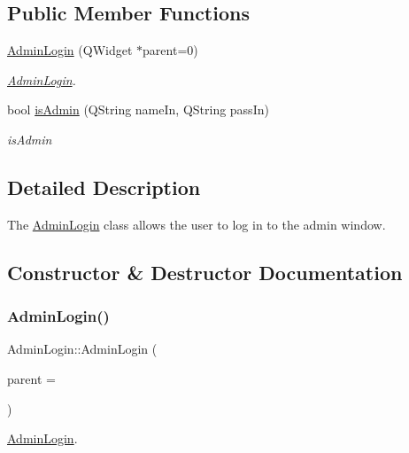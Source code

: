 \subsection*{Public Member Functions}
\begin{DoxyCompactItemize}
\item 
\hyperlink{class_admin_login_a3e1c90c550d6d7abf2a58c4919e80461}{Admin\+Login} (Q\+Widget $\ast$parent=0)
\begin{DoxyCompactList}\small\item\em \hyperlink{class_admin_login}{Admin\+Login}. \end{DoxyCompactList}\item 
bool \hyperlink{class_admin_login_a7b096251d552fafeae34a229e748398c}{is\+Admin} (Q\+String name\+In, Q\+String pass\+In)
\begin{DoxyCompactList}\small\item\em is\+Admin \end{DoxyCompactList}\end{DoxyCompactItemize}


\subsection{Detailed Description}
The \hyperlink{class_admin_login}{Admin\+Login} class allows the user to log in to the admin window. 

\subsection{Constructor \& Destructor Documentation}
\mbox{\label{class_admin_login_a3e1c90c550d6d7abf2a58c4919e80461}} 
\subsubsection{\texorpdfstring{Admin\+Login()}{AdminLogin()}}
{\footnotesize\ttfamily Admin\+Login\+::\+Admin\+Login (\begin{DoxyParamCaption}\item[{Q\+Widget $\ast$}]{parent = {} }\end{DoxyParamCaption})\hspace{0.3cm}{\ttfamily [explicit]}}



\hyperlink{class_admin_login}{Admin\+Login}. 


